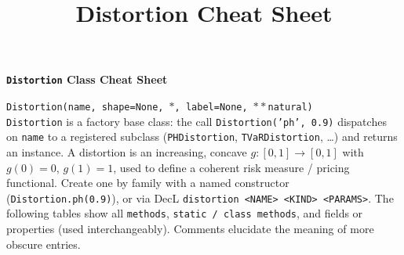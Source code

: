 %
%
%


\title{Distortion Cheat Sheet}





{\huge{\textbf{\texttt{Distortion} Class Cheat Sheet}}}

\raggedright

\texttt{\m Distortion(name, shape=None, $*$, label=None, $**$natural)} \\

\texttt{Distortion} is a factory base class: the call \texttt{Distortion('ph', 0.9)} dispatches on \texttt{name} to a registered subclass (\texttt{PHDistortion}, \texttt{TVaRDistortion}, \dots) and returns an instance. A distortion is an increasing, concave $g:[0,1]\to[0,1]$ with $g(0)=0$, $g(1)=1$, used to define a coherent risk measure / pricing functional. Create one by family with a named constructor (\texttt{\s Distortion.ph(0.9)}), or via DecL \texttt{distortion <NAME> <KIND> <PARAMS>}.
The following tables show all \texttt{\m methods}, \texttt{\s static / class methods}, and fields or properties (used interchangeably). Comments elucidate the meaning of more obscure entries.


